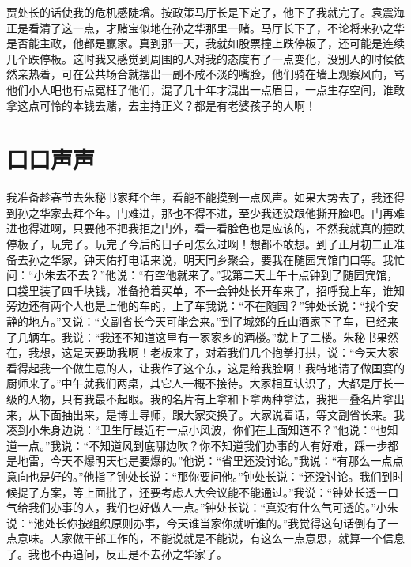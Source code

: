 \documentclass[12pt,oneside]{book}
\begin{document}
贾处长的话使我的危机感陡增。按政策马厅长是下定了，他下了我就完了。袁震海正是看清了这一点，才赌宝似地在孙之华那里一赌。马厅长下了，不论将来孙之华是否能主政，他都是赢家。真到那一天，我就如股票撞上跌停板了，还可能是连续几个跌停板。这时我又感觉到周围的人对我的态度有了一点变化，没别人的时候依然亲热着，可在公共场合就摆出一副不咸不淡的嘴脸，他们骑在墙上观察风向，骂他们小人吧也有点冤枉了他们，混了几十年才混出一点眉目，一点生存空间，谁敢拿这点可怜的本钱去赌，去主持正义？都是有老婆孩子的人啊！


\chapter{口口声声}

我准备趁春节去朱秘书家拜个年，看能不能摸到一点风声。如果大势去了，我还得到孙之华家去拜个年。门难进，那也不得不进，至少我还没跟他撕开脸吧。门再难进也得进啊，只要他不把我拒之门外，看一看脸色也是应该的，不然我就真的撞跌停板了，玩完了。玩完了今后的日子可怎么过啊！想都不敢想。到了正月初二正准备去孙之华家，钟天佑打电话来说，明天同乡聚会，要我在随园宾馆门口等。我忙问：``小朱去不去？''他说：``有空他就来了。''我第二天上午十点钟到了随园宾馆，口袋里装了四千块钱，准备抢着买单，不一会钟处长开车来了，招呼我上车，谁知旁边还有两个人也是上他的车的，上了车我说：``不在随园？''钟处长说：``找个安静的地方。''又说：``文副省长今天可能会来。''到了城郊的丘山酒家下了车，已经来了几辆车。我说：``我还不知道这里有一家家乡的酒楼。''就上了二楼。朱秘书果然在，我想，这是天要助我啊！老板来了，对着我们几个抱拳打拱，说：``今天大家看得起我一个做生意的人，让我作了这个东，这是给我脸啊！我特地请了做国宴的厨师来了。''中午就我们两桌，其它人一概不接待。大家相互认识了，大都是厅长一级的人物，只有我最不起眼。我的名片有上拿和下拿两种拿法，我把一叠名片拿出来，从下面抽出来，是博士导师，跟大家交换了。大家说着话，等文副省长来。我凑到小朱身边说：``卫生厅最近有一点小风波，你们在上面知道不？''他说：``也知道一点。''我说：``不知道风到底哪边吹？你不知道我们办事的人有好难，踩一步都是地雷，今天不爆明天也是要爆的。''他说：``省里还没讨论。''我说：``有那么一点点意向也是好的。''他指了钟处长说：``那你要问他。''钟处长说：``还没讨论。我们到时候提了方案，等上面批了，还要考虑人大会议能不能通过。''我说：``钟处长透一口气给我们办事的人，我们也好做人一点。''钟处长说：``真没有什么气可透的。''小朱说：``池处长你按组织原则办事，今天谁当家你就听谁的。''我觉得这句话倒有了一点意味。人家做干部工作的，不能说就是不能说，有这么一点意思，就算一个信息了。我也不再追问，反正是不去孙之华家了。
\end{document}
